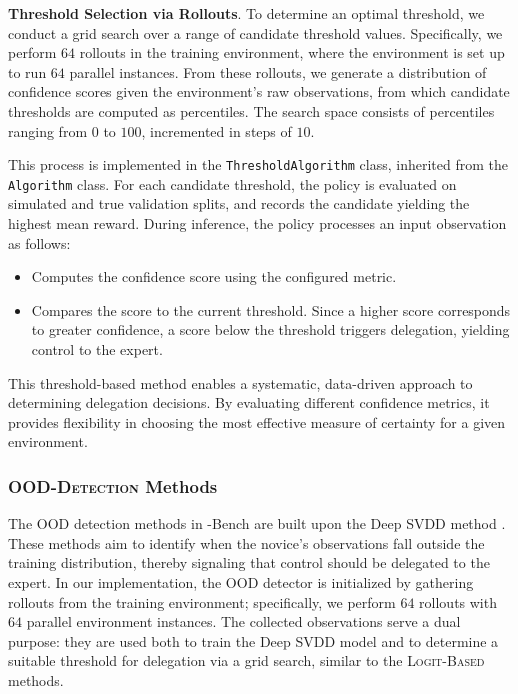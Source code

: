 \textbf{Threshold Selection via Rollouts}.
To determine an optimal threshold, we conduct a grid search over a range of candidate threshold values. Specifically, we perform $64$ rollouts in the training environment, where the environment is set up to run $64$ parallel instances. From these rollouts, we generate a distribution of confidence scores given the environment's raw observations, from which candidate thresholds are computed as percentiles. The search space consists of percentiles ranging from $0$ to $100$, incremented in steps of $10$. 

This process is implemented in the \texttt{ThresholdAlgorithm} class, inherited from the \texttt{Algorithm} class. For each candidate threshold, the policy is evaluated on simulated and true validation splits, and records the candidate yielding the highest mean reward. During inference, the policy processes an input observation as follows: 
\begin{itemize}
    \item Computes the confidence score using the configured metric.
    \item Compares the score to the current threshold. Since a higher score corresponds to greater confidence, a score below the threshold triggers delegation, yielding control to the expert.
\end{itemize}

This threshold-based method enables a systematic, data-driven approach to determining delegation decisions. By evaluating different confidence metrics, it provides flexibility in choosing the most effective measure of certainty for a given environment. 




\subsubsection{\textsc{OOD-Detection} Methods}
The OOD detection methods in \ourMethod-Bench are built upon the Deep SVDD method \citep{pmlr-v80-ruff18a}. These methods aim to identify when the novice's observations fall outside the training distribution, thereby signaling that control should be delegated to the expert. In our implementation, the OOD detector is initialized by gathering rollouts from the training environment; specifically, we perform $64$ rollouts with $64$ parallel environment instances. The collected observations serve a dual purpose: they are used both to train the Deep SVDD model and to determine a suitable threshold for delegation via a grid search, similar to the \textsc{Logit-Based} methods.

